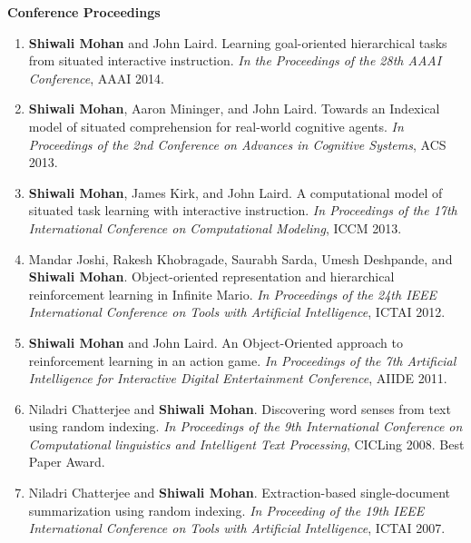 \documentclass[margin,line,11pt]{res}
\begin{document}
\begin{resume}
                  \textbf{Conference Proceedings}
                  \begin{enumerate}[label=\lbrack C\arabic*\rbrack,leftmargin=*]
                  \item \textbf{Shiwali Mohan} and John Laird. Learning goal-oriented hierarchical tasks from situated interactive instruction. \emph{In the Proceedings of the 28th AAAI Conference}, AAAI 2014.
                  \item \textbf{Shiwali Mohan}, Aaron Mininger, and John Laird. Towards an Indexical model of situated comprehension for real-world cognitive agents. \emph{In Proceedings of the 2nd Conference on Advances in Cognitive Systems}, ACS 2013.
                  \item \textbf{Shiwali Mohan}, James Kirk, and John Laird. A computational model of situated task learning with interactive instruction. \emph{In Proceedings of the 17th International Conference on Computational Modeling}, ICCM 2013.
                  \item Mandar Joshi, Rakesh Khobragade, Saurabh Sarda, Umesh Deshpande, and \textbf{Shiwali Mohan}. Object-oriented
                    representation and hierarchical reinforcement learning in Infinite Mario. \emph{In Proceedings of the 24th IEEE
                      International Conference on Tools with Artificial Intelligence}, ICTAI 2012.
                  \item \textbf{Shiwali Mohan} and John Laird. An Object-Oriented approach to reinforcement learning in an action game.
                    \emph{In Proceedings of the 7th Artificial Intelligence for Interactive Digital Entertainment Conference}, AIIDE 2011.
                  \item Niladri Chatterjee and \textbf{Shiwali Mohan}. Discovering word senses from text using random indexing. \emph{In
                    Proceedings of the 9th International Conference on Computational linguistics and Intelligent Text Processing},
                    CICLing 2008. Best Paper Award.
                  \item Niladri Chatterjee and \textbf{Shiwali Mohan}. Extraction-based single-document summarization using random
                    indexing. \emph{In Proceeding of the 19th IEEE International Conference on Tools with Artificial Intelligence}, ICTAI
                    2007.
                  \end{enumerate}


\end{resume}
\end{document}
